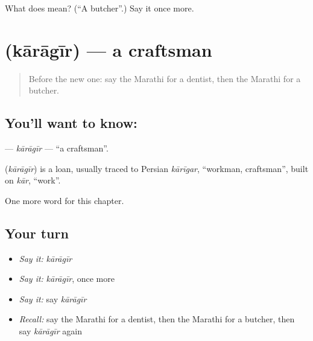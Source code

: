 \begin{tcolorbox}[breakable,colback=teal!4,colframe=teal!35!black,title={Before you move on}]
What does  mean? (\textquotedblleft{}A butcher\textquotedblright{}.) Say it once more.
\end{tcolorbox}
\section[\texorpdfstring{\mr{कारागीर} (kārāgīr)}{कारागीर (kārāgīr)}]{ (kārāgīr) — a craftsman}

\label{lesson:MR-C210-karagir}



\begin{quote}
Before the new one: say the Marathi for a dentist, then the Marathi for a butcher.
\end{quote}

\subsection*{You'll want to know: }
\textbf{} — \emph{kārāgīr} — \textquotedblleft{}a craftsman\textquotedblright{}.

\begin{cousinweb}
\textbf{} (\emph{kārāgīr}) is a loan, usually traced to Persian \emph{kārīgar}, \textquotedblleft{}workman, craftsman\textquotedblright{}, built on \emph{kār}, \textquotedblleft{}work\textquotedblright{}.
\end{cousinweb}

\begin{grammarlens}[title={What you've built}]
One more word for this chapter.
\end{grammarlens}

\subsection*{Your turn}
\begin{itemize}
\raggedright
  \item \emph{Say it:} \emph{kārāgīr}
  \item \emph{Say it:} \emph{kārāgīr}, once more
  \item \emph{Say it:} say \emph{kārāgīr}
  \item \emph{Recall:} say the Marathi for a dentist, then the Marathi for a butcher, then say \emph{kārāgīr} again
\end{itemize}

